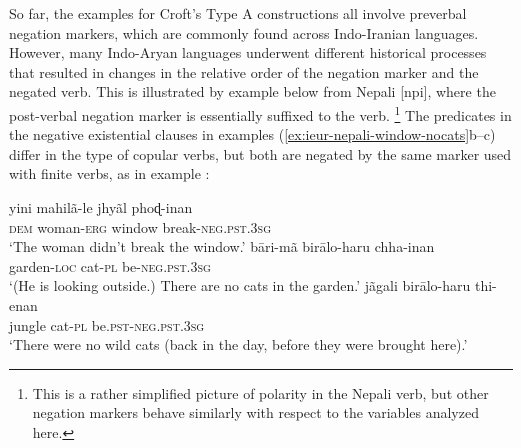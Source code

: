 ﻿\documentclass[output=paper]{langsci/langscibook}
\begin{document}
So far, the examples for Croft's Type A constructions all involve preverbal
negation markers, which are commonly found across Indo-Iranian languages.
However, many Indo-Aryan languages underwent different historical processes
that resulted in changes in the relative order of the negation marker and
the negated verb. This is illustrated by example  below
from Nepali [npi], where the post-verbal negation marker is essentially
suffixed to the verb.%
%
\footnote{This is a rather simplified picture of
polarity in the Nepali verb, but other negation markers behave similarly
with respect to the variables analyzed here.} 
%
The predicates in the negative existential clauses in examples
(\ref{ex:ieur-nepali-window-nocats}b--c) differ in the type of
copular verbs, but both are negated by the same marker used with finite
verbs, as in example : 
%
\begin{exe}\ex\label{ex:ieur-nepali-window-nocats}
\begin{xlist}
\ex\label{ex:ieur-nepali-window}
    \gll yini  mahilã-le jhyãl phoɖ-inan\\
  \textsc{dem} woman-\textsc{erg} window  break-\textsc{neg.pst.3sg} \\
    \glt `The woman didn't break the window.'
\ex
\gll bāri-mã       birālo-haru  chha-inan \\
garden-\textsc{loc} cat-\textsc{pl} be-\textsc{neg.pst.3sg}\\
\glt `(He is looking outside.) There are no cats in the garden.'
\ex
\gll jãgali  birālo-haru  thi-enan\\
jungle cat-\textsc{pl}
be.\textsc{pst}-\textsc{neg}.\textsc{pst}.\textsc{3sg}\\ 
\glt `There were no wild cats (back in the day, before they were brought
here).'
\end{xlist}\end{exe}
\end{document}
